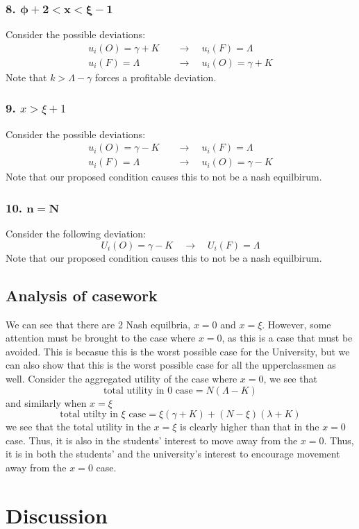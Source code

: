 \documentclass[12pt]{article}
\begin{document}
\subsubsection*{8. $\mathbf{\phi + 2 < x < \xi -1}$}
Consider the possible deviations:
\begin{align*}
    u_i(O) = \gamma + K \quad &\to \quad u_i(F) = \Lambda\\
    u_i(F) = \Lambda \quad &\to \quad u_i(O) = \gamma + K
\end{align*}
Note that $k > \Lambda - \gamma$ forces a profitable deviation. 
\subsubsection*{9. $x > \xi + 1$}
Consider the possible deviations:
\begin{align*}
    u_i(O) = \gamma - K \quad &\to \quad u_i(F) = \Lambda  \\
    u_i(F) = \Lambda \quad &\to \quad u_i(O) = \gamma - K
\end{align*}
Note that our proposed condition causes this to not be a nash equilbirum. 
\subsubsection*{10. $\mathbf{n = N}$}
Consider the following deviation:
\[
U_i(O) = \gamma - K \quad \to \quad  U_i(F) = \Lambda 
\]
Note that our proposed condition causes this to not be a nash equilbirum. 
\subsection{Analysis of casework}
We can see that there are 2 Nash equilbria, $x = 0$ and $x = \xi$. However, some attention must be brought to the case where $x = 0$, as this is a case that must be avoided. This is becasue this is the worst possible case for the University, but we can also show that this is the worst possible case for all the upperclassmen as well. Consider the aggregated utility of the case where $x = 0$, we see that 
\[
\text{total utility in 0 case} = N(\Lambda - K)
\]
and similarly when $x = \xi$
\[
\text{total utilty in } \xi \text{ case} = \xi(\gamma + K) + (N - \xi)(\lambda + K)
\]
we see that the total utility in the $x = \xi$ is clearly higher than that in the $x = 0$ case. Thus, it is also in the students' interest to move away from the $x = 0$. Thus, it is in both the students’ and the university’s interest to encourage movement away from the $x=0$ case.
\section{Discussion}
\end{document}
